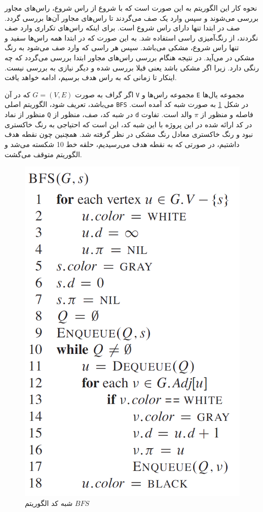 نحوه کار این الگوریتم به این صورت است که با شروع از راس شروع، راس‌های مجاور بررسی می‌شوند و سپس وارد یک صف می‌گردند تا راس‌های مجاور آن‌ها بررسی گردد. صف در ابتدا تنها دارای راس شروع است. برای اینکه راس‌های تکراری وارد صف نگردند، از رنگ‌آمیزی راسی استفاده شد. به این صورت که در ابتدا همه راس‌ها سفید و تنها راس شروع، مشکی می‌باشد. سپس هر راسی که وارد صف می‌شود به رنگ مشکی در می‌آید. در نتیجه هنگام بررسی راس‌های مجاور ابتدا بررسی می‌گردد که چه رنگی دارد. زیرا اگر مشکی باشد یعنی قبلا بررسی شده و دیگر نیازی به بررسی نیست. اینکار تا زمانی که به راس هدف برسیم، ادامه خواهد یافت.

اگر گراف به صورت 
$G = (V, E)$
که در آن \verb|V| مجموعه راس‌ها و \verb|E| مجموعه یال‌ها می‌باشد، تعریف شود، الگوریتم اصلی \verb|BFS| در شکل \ref{Fig BFS Algorithm} به صورت شبه کد آمده است. منظور از نماد \verb|Q| در شبه کد، صف، منظور از \verb|d| فاصله و منظور از $\pi$ والد است. تفاوت در کد ارائه شده در این پروژه با این شبه کد، این است که احتیاجی به رنگ خاکستری نبود و رنگ خاکستری معادل رنگ مشکی در نظر گرفته شد. همچنین چون نقطه هدف داشتیم، در صورتی که به نقطه هدف می‌رسیدیم، حلقه خط 10 شکسته می‌شد و الگوریتم متوقف می‌گشت.
\begin{figure}[!h]
	\centering
	\includegraphics[scale=0.4]{Images/BFS-algorithm.png}
	\caption{شبه کد الگوریتم $BFS$}\label{Fig BFS Algorithm}
\end{figure}

